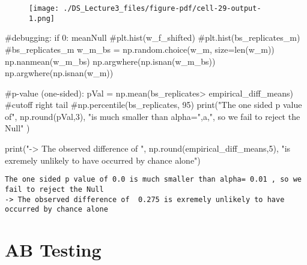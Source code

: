 \documentclass[
  letterpaper,
  DIV=11,
  numbers=noendperiod]{scrreprt}
\newenvironment{Shaded}{\begin{snugshade}}{\end{snugshade}}
\newcommand{\BuiltInTok}[1]{\textcolor[rgb]{0.00,0.23,0.31}{#1}}
\newcommand{\CommentTok}[1]{\textcolor[rgb]{0.37,0.37,0.37}{#1}}
\newcommand{\ControlFlowTok}[1]{\textcolor[rgb]{0.00,0.23,0.31}{#1}}
\newcommand{\DecValTok}[1]{\textcolor[rgb]{0.68,0.00,0.00}{#1}}
\newcommand{\NormalTok}[1]{\textcolor[rgb]{0.00,0.23,0.31}{#1}}
\newcommand{\OperatorTok}[1]{\textcolor[rgb]{0.37,0.37,0.37}{#1}}
\newcommand{\StringTok}[1]{\textcolor[rgb]{0.13,0.47,0.30}{#1}}
\begin{document}
\begin{figure}[H]

{\centering \texttt{[image: ./DS\_Lecture3\_files/figure-pdf/cell-29-output-1.png]}

}

\end{figure}

\begin{Shaded}
\begin{Highlighting}[]
\CommentTok{\#debugging:}
\ControlFlowTok{if} \DecValTok{0}\NormalTok{:}
\NormalTok{    meanNull}
    \CommentTok{\#plt.hist(w\_f\_shifted)}
    \CommentTok{\#plt.hist(bs\_replicates\_m)}
    \CommentTok{\#bs\_replicates\_m}
\NormalTok{    w\_m\_bs }\OperatorTok{=}\NormalTok{ np.random.choice(w\_m, size}\OperatorTok{=}\BuiltInTok{len}\NormalTok{(w\_m))}
\NormalTok{    np.nanmean(w\_m\_bs)}
\NormalTok{    np.argwhere(np.isnan(w\_m\_bs))}
\NormalTok{    np.argwhere(np.isnan(w\_m))}

\CommentTok{\#p{-}value (one{-}sided):}
\NormalTok{pVal }\OperatorTok{=}\NormalTok{ np.mean(bs\_replicates}\OperatorTok{\textgreater{}}\NormalTok{ empirical\_diff\_means)}
\CommentTok{\#cutoff right tail}
\CommentTok{\#np.percentile(bs\_replicates, 95)}
\BuiltInTok{print}\NormalTok{(}\StringTok{"The one sided p value of"}\NormalTok{, np.}\BuiltInTok{round}\NormalTok{(pVal,}\DecValTok{3}\NormalTok{), }\StringTok{"is much smaller than alpha="}\NormalTok{,a,}\StringTok{", so we fail to reject the Null"}\NormalTok{ ) }

\BuiltInTok{print}\NormalTok{(}\StringTok{"{-}\textgreater{} The observed difference of "}\NormalTok{, np.}\BuiltInTok{round}\NormalTok{(empirical\_diff\_means,}\DecValTok{5}\NormalTok{), }\StringTok{"is exremely unlikely to have occurred by chance alone"}\NormalTok{)}
\end{Highlighting}
\end{Shaded}

\begin{verbatim}
The one sided p value of 0.0 is much smaller than alpha= 0.01 , so we fail to reject the Null
-> The observed difference of  0.275 is exremely unlikely to have occurred by chance alone
\end{verbatim}


\hypertarget{ab-testing-1}{%
\chapter{AB Testing}\label{ab-testing-1}}
\end{document}
